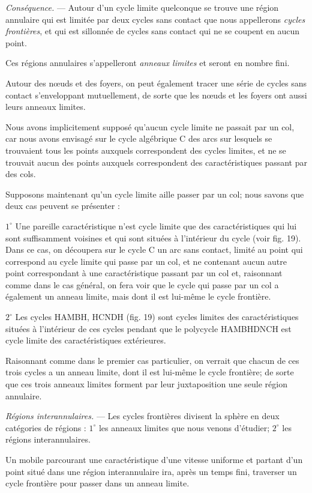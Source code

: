 \documentclass[11pt]{article}
\begin{document}
\emph{Conséquence.} --- Autour d'un cycle limite quelconque se trouve une région annulaire qui est limitée par deux cycles sans contact que nous appellerons \emph{cycles frontières}, et qui est sillonnée de cycles sans contact qui ne se coupent en aucun point.

Ces régions annulaires s'appelleront \emph{anneaux limites} et seront en nombre fini.

Autour des nœuds et des foyers, on peut également tracer une série de cycles sans contact s'enveloppant mutuellement, de sorte que les nœuds et les foyers ont aussi leurs anneaux limites.

Nous avons implicitement supposé qu'aucun cycle limite ne passait par un col, car nous avons envisagé sur le cycle algébrique C des arcs sur lesquels se trouvaient tous les points auxquels correspondent des cycles limites, et ne se trouvait aucun des points auxquels correspondent des caractéristiques passant par des cols.

Supposons maintenant qu'un cycle limite aille passer par un col; nous savons que deux cas peuvent se présenter :

$1^\circ$ Une pareille caractéristique n'est cycle limite que des caractéristiques qui lui sont suffisamment voisines et qui sont situées à l'intérieur du cycle (voir fig. 19). Dans ce cas, on découpera sur le cycle C un arc sans contact, limité au point qui correspond au cycle limite qui passe par un col, et ne contenant aucun autre point correspondant à une caractéristique passant par un col et, raisonnant comme dans le cas général, on fera voir que le cycle qui passe par un col a également un anneau limite, mais dont il est lui-même le cycle frontière.

$2^\circ$ Les cycles HAMBH, HCNDH (fig. 19) sont cycles limites des caractéristiques situées à l'intérieur de ces cycles pendant que le polycycle HAMBHDNCH est cycle limite des caractéristiques extérieures.

Raisonnant comme dans le premier cas particulier, on verrait que chacun de ces trois cycles a un anneau limite, dont il est lui-même le cycle frontière; de sorte que ces trois anneaux limites forment par leur juxtaposition une seule région annulaire.

\emph{Régions interannulaires.} --- Les cycles frontières divisent la sphère en deux catégories de régions : $1^\circ$ les anneaux limites que nous venons d'étudier; $2^\circ$ les régions interannulaires.

Un mobile parcourant une caractéristique d'une vitesse uniforme et partant d'un point situé dans une région interannulaire ira, après un temps fini, traverser un cycle frontière pour passer dans un anneau limite.
\end{document}
